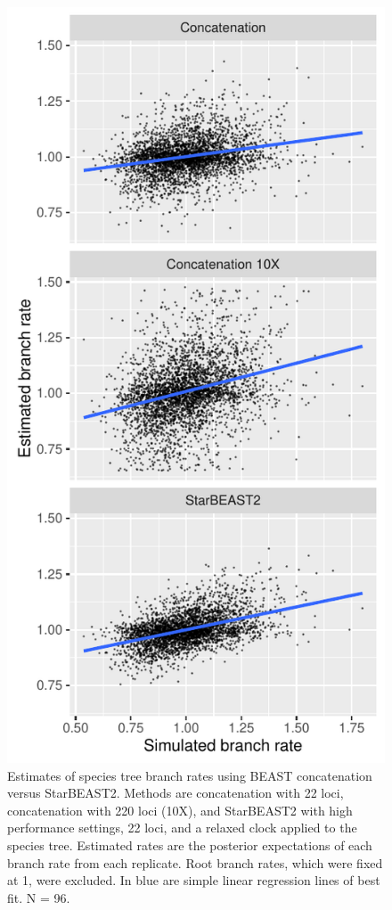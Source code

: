 \documentclass[nogrid]{MBE}%
\begin{document}
\begin{figure}[htb!]
\centering
\includegraphics[width=\columnwidth]{branch_rates.pdf}
\caption
{Estimates of species tree branch rates using BEAST concatenation versus StarBEAST2.
Methods are concatenation with 22 loci, concatenation with 220 loci (10X), and
StarBEAST2 with high performance settings, 22 loci, and a relaxed clock applied
to the species tree. Estimated rates are the posterior expectations of each
branch rate from each replicate. Root branch rates, which were fixed at 1,
were excluded. In blue are simple linear regression lines of best fit. N = 96.}
\label{fig:branchRates}
\end{figure}
\end{document}
